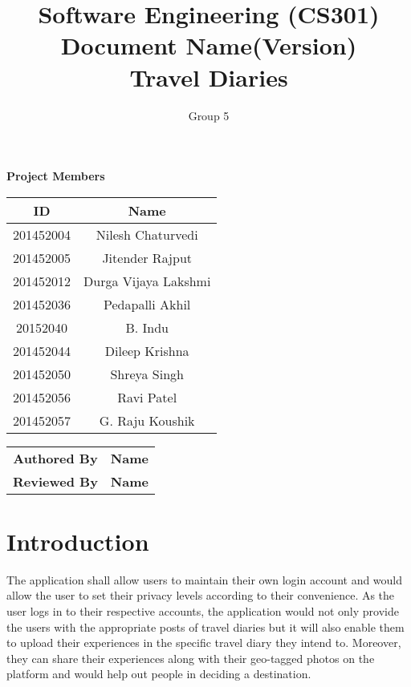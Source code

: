 \documentclass[]{article}
\title{Software Engineering (CS301)\\ Document Name(Version)\\Travel Diaries}
\author{Group 5}
\begin{document}
\maketitle


\begin{center}
\textbf{Project Members}\\
\vspace*{.6cm}
\begin{tabular}{|c|c|}
\hline
\textbf{ID} & \textbf{Name}\\
\hline
\hline
201452004 & Nilesh Chaturvedi\\
\hline
201452005 & Jitender Rajput\\
\hline
201452012 & Durga Vijaya Lakshmi\\
\hline
201452036 & Pedapalli Akhil\\
\hline
20152040 & B. Indu\\
\hline
201452044 & Dileep Krishna\\
\hline
201452050 & Shreya Singh\\
\hline
201452056 & Ravi Patel\\
\hline
201452057 & G. Raju Koushik\\
\hline
\end{tabular}

\vspace*{1cm}

\begin{tabular}{|c|c|}
\hline
\textbf{Authored By} & \textbf{Name}\\
\textbf{Reviewed By} & \textbf{Name}\\
\hline
\end{tabular}
\end{center}

\newpage
\tableofcontents
\newpage


\section{Introduction}
The application shall allow users to maintain their own login account and would allow the user to set
their privacy levels according to their convenience. As the user logs in to their respective accounts, the
application would not only provide the users with the appropriate posts of travel diaries but it will also
enable them to upload their experiences in the specific travel diary they intend to. Moreover, they can
share their experiences along with their geo-tagged photos on the platform and would help out people
in deciding a destination.
\end{document}
